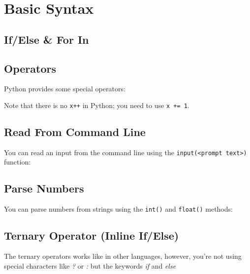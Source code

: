 \section{Basic Syntax}

    \subsection{If/Else \& For In}

    \subsection{Operators}
        Python provides some special operators:


        Note that there is no \texttt{x++} in Python; you need to use
        \texttt{x += 1}.

    \subsection{Read From Command Line}
        You can read an input from the command line using the
        \texttt{input(<prompt text>)} function:


    \subsection{Parse Numbers}
        You can parse numbers from strings using the
        \texttt{int()} and \texttt{float()} methods:


    \subsection{Ternary Operator (Inline If/Else)}
        The ternary operators works like in other languages, however, you're not using special
        characters like \textit{?} or \textit{:} but the keywords \textit{if} and \textit{else}

